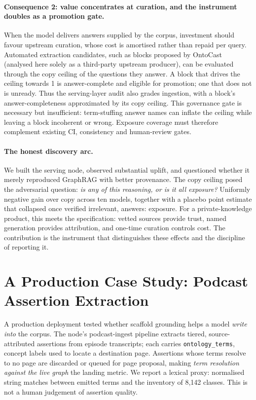 \documentclass[10pt,twocolumn]{article}
\begin{document}
\paragraph{Consequence 2: value concentrates at curation, and the instrument doubles as a promotion
gate.} When the model delivers answers supplied by the corpus, investment should favour upstream curation, whose cost is amortised rather than repaid per query. Automated extraction candidates, such as blocks proposed by OntoCast~\cite{ontocast} (analysed here solely as a third-party upstream producer), can be evaluated through the copy ceiling of the questions they answer. A block that drives the ceiling towards 1 is answer-complete and eligible for promotion; one that does not is unready. Thus the serving-layer audit also grades ingestion, with a block's answer-completeness approximated by its copy ceiling. This governance gate is necessary but insufficient: term-stuffing answer names can inflate the ceiling while leaving a block incoherent or wrong. Exposure coverage must therefore complement existing CI, consistency and human-review gates.

\paragraph{The honest discovery arc.} We built the serving node, observed substantial uplift, and questioned whether it merely reproduced GraphRAG with better provenance. The copy ceiling posed the adversarial question: \emph{is any of this reasoning, or is it all exposure?} Uniformly negative gain over copy across ten models, together with a placebo point estimate that collapsed once verified irrelevant, answers: exposure. For a private-knowledge product, this meets the specification: vetted sources provide trust, named generation provides attribution, and one-time curation controls cost. The contribution is the instrument that distinguishes these effects and the discipline of reporting it.


\section{A Production Case Study: Podcast Assertion Extraction}\label{sec:casestudy}
A production deployment tested whether scaffold grounding helps a model \emph{write into} the
corpus. The node's podcast-ingest pipeline extracts tiered, source-attributed assertions from
episode transcripts; each carries \texttt{ontology\_terms}, concept labels used to locate a
destination page. Assertions whose terms resolve to no page are discarded or queued for page
proposal, making \emph{term resolution against the live graph} the landing metric. We report a
lexical proxy: normalised string matches between emitted terms and the inventory of 8{,}142
classes. This is not a human judgement of assertion quality.
\end{document}
